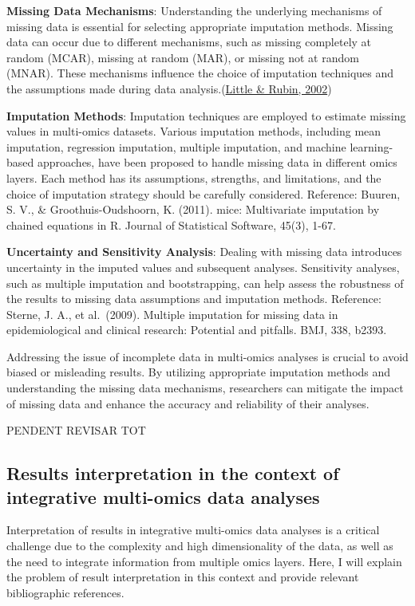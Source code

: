 \documentclass[a4paper, nobind]{templates/ociamthesis}
\begin{document}
\textbf{Missing Data Mechanisms}: Understanding the underlying mechanisms of missing data is essential for selecting appropriate imputation methods. Missing data can occur due to different mechanisms, such as missing completely at random (MCAR), missing at random (MAR), or missing not at random (MNAR). These mechanisms influence the choice of imputation techniques and the assumptions made during data analysis.(\protect\hyperlink{ref-little_missing_2002}{Little \& Rubin, 2002})

\textbf{Imputation Methods}: Imputation techniques are employed to estimate missing values in multi-omics datasets. Various imputation methods, including mean imputation, regression imputation, multiple imputation, and machine learning-based approaches, have been proposed to handle missing data in different omics layers. Each method has its assumptions, strengths, and limitations, and the choice of imputation strategy should be carefully considered. Reference: Buuren, S. V., \& Groothuis-Oudshoorn, K. (2011). mice: Multivariate imputation by chained equations in R. Journal of Statistical Software, 45(3), 1-67.

\textbf{Uncertainty and Sensitivity Analysis}: Dealing with missing data introduces uncertainty in the imputed values and subsequent analyses. Sensitivity analyses, such as multiple imputation and bootstrapping, can help assess the robustness of the results to missing data assumptions and imputation methods. Reference: Sterne, J. A., et al.~(2009). Multiple imputation for missing data in epidemiological and clinical research: Potential and pitfalls. BMJ, 338, b2393.

Addressing the issue of incomplete data in multi-omics analyses is crucial to avoid biased or misleading results. By utilizing appropriate imputation methods and understanding the missing data mechanisms, researchers can mitigate the impact of missing data and enhance the accuracy and reliability of their analyses.

PENDENT REVISAR TOT

\hypertarget{results-interpretation-in-the-context-of-integrative-multi-omics-data-analyses}{%
\subsection{Results interpretation in the context of integrative multi-omics data analyses}\label{results-interpretation-in-the-context-of-integrative-multi-omics-data-analyses}}

Interpretation of results in integrative multi-omics data analyses is a critical challenge due to the complexity and high dimensionality of the data, as well as the need to integrate information from multiple omics layers. Here, I will explain the problem of result interpretation in this context and provide relevant bibliographic references.
\end{document}

